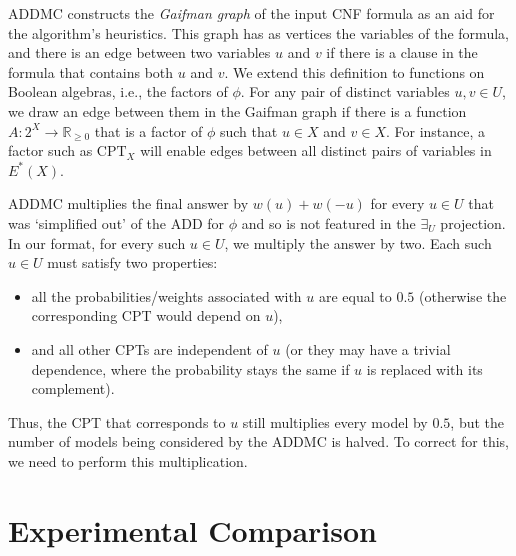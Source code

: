 \documentclass{article}
\theoremstyle{definition}
\theoremstyle{remark}
\begin{document}
{ADDMC constructs the \emph{Gaifman graph} \cite{gaifman1982local} of the input
CNF formula as an aid for the algorithm's heuristics. This graph has as vertices
the variables of the formula, and there is an edge between two variables $u$ and
$v$ if there is a clause in the formula that contains both $u$ and $v$. We
extend this definition to functions on Boolean algebras, i.e., the factors of
$\phi$. For any pair of distinct variables $u, v \in U$, we draw an edge between
them in the Gaifman graph if there is a function $A\colon 2^X \to
\mathbb{R}_{\ge 0}$ that is a factor of $\phi$ such that $u \in X$ and $v \in
X$. For instance, a factor such as $\mathrm{CPT}_X$ will enable edges between
all distinct pairs of variables in $E^*(X)$.

ADDMC multiplies the final answer by $w(u)+w(-u)$ for every $u \in U$ that was
`simplified out' of the ADD for $\phi$ and so is not featured in the $\exists_U$
projection. In our format, for every such $u \in U$, we multiply the answer by
two. Each such $u \in U$ must satisfy two properties:
\begin{itemize}
\item all the probabilities/weights associated with $u$ are equal to $0.5$
  (otherwise the corresponding CPT would depend on $u$),
\item and all other CPTs are independent of $u$ (or they may have a trivial
  dependence, where the probability stays the same if $u$ is replaced with its
  complement).
\end{itemize}
Thus, the CPT that corresponds to $u$ still multiplies every model by $0.5$, but
the number of models being considered by the ADDMC is halved. To correct for
this, we need to perform this multiplication.

\section{Experimental Comparison} \label{sec:experiments}

}
\end{document}
